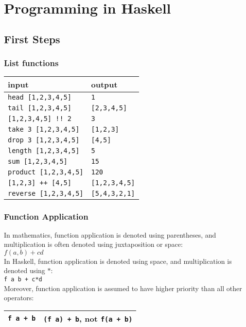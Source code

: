 \section{Programming in Haskell}
\begin{multicols}{2}
\subsection{First Steps}
\subsubsection{List functions}
\begin{tabularx}{\linewidth}{|X|X|}
  \hline
  \textbf{input} & \textbf{output} \\
  \hline
  \lstinline|head [1,2,3,4,5]| & \lstinline|1| \\
  \hline
  \lstinline|tail [1,2,3,4,5]| & \lstinline|[2,3,4,5]| \\
  \hline
  \lstinline|[1,2,3,4,5] !! 2| & \lstinline|3| \\
  \hline
  \lstinline|take 3 [1,2,3,4,5]| & \lstinline|[1,2,3]| \\
  \hline
  \lstinline|drop 3 [1,2,3,4,5]| & \lstinline|[4,5]| \\
  \hline
  \lstinline|length [1,2,3,4,5]| & \lstinline|5| \\
  \hline
  \lstinline|sum [1,2,3,4,5]| & \lstinline|15| \\
  \hline
  \lstinline|product [1,2,3,4,5]| & \lstinline|120| \\
  \hline
  \lstinline|[1,2,3] ++ [4,5]| & \lstinline|[1,2,3,4,5]| \\
  \hline
  \lstinline|reverse [1,2,3,4,5]| & \lstinline|[5,4,3,2,1]| \\
  \hline
\end{tabularx}

\subsubsection{Function Application}
In mathematics, function application is denoted using parentheses, and multiplication is often denoted using juxtaposition or space:\\
$f(a,b) + c d$\\
In Haskell, function application is denoted using space, and multiplication is denoted using $*$:\\
\lstinline{f a b + c*d}\\
Moreover, function application is assumed to have higher priority than all other operators:\\
\begin{tabularx}{\linewidth}{|X|X|}
  \hline
  \lstinline|f a + b| & \lstinline|(f a) + b|, \textbf{not} \lstinline|f(a + b)|\\
  \hline
\end{tabularx}


\end{multicols}
